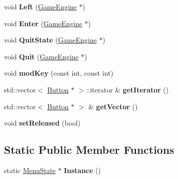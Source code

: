 \begin{DoxyCompactItemize}
\item 
\hypertarget{class_menu_state_a611c61faf814406f800bffc89e9525de}{}void {\bfseries Left} (\hyperlink{class_game_engine}{Game\+Engine} $\ast$)\label{class_menu_state_a611c61faf814406f800bffc89e9525de}

\item 
\hypertarget{class_menu_state_a94c364c1f27259d934c3ead55dbd6d2e}{}void {\bfseries Enter} (\hyperlink{class_game_engine}{Game\+Engine} $\ast$)\label{class_menu_state_a94c364c1f27259d934c3ead55dbd6d2e}

\item 
\hypertarget{class_menu_state_a2a5d84c07ac61593ed2d84e39f0b3f08}{}void {\bfseries Quit\+State} (\hyperlink{class_game_engine}{Game\+Engine} $\ast$)\label{class_menu_state_a2a5d84c07ac61593ed2d84e39f0b3f08}

\item 
\hypertarget{class_menu_state_aa56b6fdef947bd121b1a053558c4719a}{}void {\bfseries Quit} (\hyperlink{class_game_engine}{Game\+Engine} $\ast$)\label{class_menu_state_aa56b6fdef947bd121b1a053558c4719a}

\item 
\hypertarget{class_menu_state_a4a269d32d2b54f43202b61d704741c5d}{}void {\bfseries mod\+Key} (const int, const int)\label{class_menu_state_a4a269d32d2b54f43202b61d704741c5d}

\item 
\hypertarget{class_menu_state_a5067b6c292605cf5c8a37432b6b77825}{}std\+::vector$<$ \hyperlink{class_button}{Button} $\ast$ $>$\+::iterator \& {\bfseries get\+Iterator} ()\label{class_menu_state_a5067b6c292605cf5c8a37432b6b77825}

\item 
\hypertarget{class_menu_state_ae593adab405c73565ce3e38ea78e462e}{}std\+::vector$<$ \hyperlink{class_button}{Button} $\ast$ $>$ \& {\bfseries get\+Vector} ()\label{class_menu_state_ae593adab405c73565ce3e38ea78e462e}

\item 
\hypertarget{class_menu_state_a5ce4d9fa1be03257f5d9151269845809}{}void {\bfseries set\+Released} (bool)\label{class_menu_state_a5ce4d9fa1be03257f5d9151269845809}

\end{DoxyCompactItemize}
\subsection*{Static Public Member Functions}
\begin{DoxyCompactItemize}
\item 
\hypertarget{class_menu_state_abb06231209c84fefb9fb31ffbd1028bd}{}static \hyperlink{class_menu_state}{Menu\+State} $\ast$ {\bfseries Instance} ()\label{class_menu_state_abb06231209c84fefb9fb31ffbd1028bd}

\end{DoxyCompactItemize}
